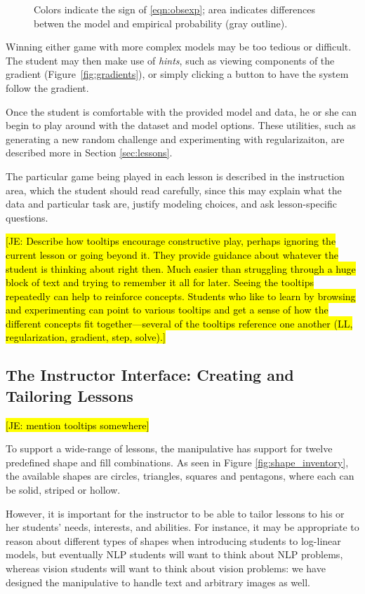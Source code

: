 \documentclass[11pt,letterpaper]{article}
\newcommand{\Note}[1]{}
\renewcommand{\Note}[1]{\hl{[#1]}}  %
\newcommand{\NoteSigned}[3]{{\sethlcolor{#2}\Note{#1: #3}}}
\newcommand{\NoteJE}[1]{\NoteSigned{JE}{LightGreen}{#1}}
\begin{document}
\begin{figure}[t]
\caption{Colors indicate the sign of \eqref{eqn:obsexp}; area indicates 
differences betwen the model and empirical probability (gray outline).}
\label{fig:colorsize_inventory}
\end{figure}

Winning either game with more complex models may be too tedious or difficult. 
The student may then make use of \textit{hints}, such as
viewing components of the gradient (Figure~\ref{fig:gradients}), or simply clicking a button to have
the system follow the gradient.  

Once the student is comfortable with the provided model and data, he
or she can begin to play around with the dataset and model options. These utilities, such as
generating a new random challenge and experimenting with regularizaiton, 
are described more in Section \ref{sec:lessons}.

The particular game being played in each lesson is described in the
instruction area, which the student should read carefully, since this
may explain what the data and particular task are, justify modeling
choices, and ask lesson-specific questions.

\NoteJE{Describe how tooltips encourage constructive play, perhaps
  ignoring the current lesson or going beyond it.  They provide
  guidance about whatever the student is thinking about right
  then. Much easier than struggling through a huge block of text and
  trying to remember it all for later. Seeing the tooltips repeatedly
  can help to reinforce concepts. Students who like to learn by
  browsing and experimenting can point to various tooltips and get a
  sense of how the different concepts fit together---several of the
  tooltips reference one another (LL, regularization, gradient, step,
  solve).}

\subsection{The Instructor Interface: Creating and Tailoring Lessons}\label{sec:tailoring}

\NoteJE{mention tooltips somewhere}

To support a wide-range of lessons, the manipulative has support for twelve predefined shape and fill combinations.
As seen in Figure \ref{fig:shape_inventory}, the available shapes are circles, triangles, squares and pentagons,
where each can be solid, striped or hollow.

However, it is important for the instructor to be able to tailor lessons to his or her students' needs, 
interests, and abilities. For instance, it may be appropriate to reason about different types of shapes
when introducing students to log-linear models, but eventually NLP students will want to think about 
NLP problems, whereas vision students will want to think about vision problems: we have designed the manipulative to handle text
and arbitrary images as well.
\end{document}
